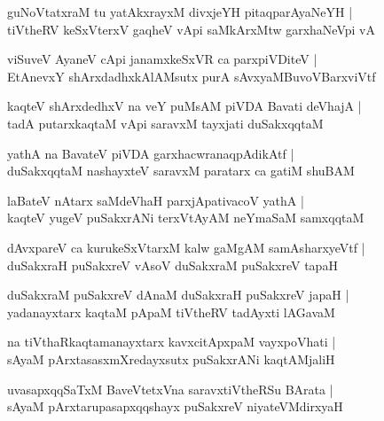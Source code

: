 \begin{shloka}
guNoVtatxraM tu yatAkxrayxM divxjeYH pitaqparAyaNeYH |\\
tiVtheRV keSxVterxV gaqheV vApi saMkArxMtw garxhaNeVpi vA 
\end{shloka}

\begin{shloka}
viSuveV AyaneV cApi janamxkeSxVR ca parxpiVDiteV |\\
EtAnevxY shArxdadhxkAlAMsutx purA sAvxyaMBuvoVBarxviVtf  
\end{shloka}

\begin{shloka}
kaqteV shArxdedhxV na veY puMsAM piVDA Bavati deVhajA |\\
tadA putarxkaqtaM vApi saravxM tayxjati duSakxqqtaM 
\end{shloka}

\begin{shloka}
yathA na BavateV piVDA garxhacwranaqpAdikAtf |\\
duSakxqqtaM nashayxteV saravxM paratarx ca gatiM shuBAM 
\end{shloka}

\begin{shloka}
laBateV nAtarx saMdeVhaH parxjApativacoV yathA |\\
kaqteV yugeV puSakxrANi terxVtAyAM neYmaSaM samxqqtaM 
\end{shloka}

\begin{shloka}
dAvxpareV ca kurukeSxVtarxM kalw gaMgAM samAsharxyeVtf |\\
duSakxraH puSakxreV vAsoV duSakxraM puSakxreV tapaH 
\end{shloka}

\begin{shloka}
duSakxraM puSakxreV dAnaM duSakxraH puSakxreV japaH |\\
yadanayxtarx kaqtaM pApaM tiVtheRV tadAyxti lAGavaM
\end{shloka}

\begin{shloka}
na tiVthaRkaqtamanayxtarx kavxcitApxpaM vayxpoVhati |\\
sAyaM pArxtasasxmXredayxsutx puSakxrANi kaqtAMjaliH
\end{shloka}

\begin{shloka}
uvasapxqqSaTxM BaveVtetxVna saravxtiVtheRSu BArata |\\
sAyaM pArxtarupasapxqqshayx puSakxreV niyateVMdirxyaH 
\end{shloka}

